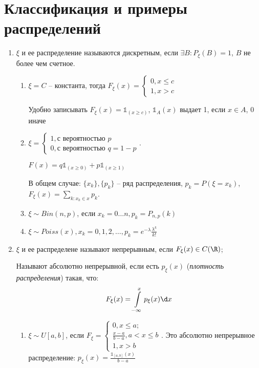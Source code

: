 \section{Классификация и примеры распределений}
\begin{enumerate}[label=\Roman*.]
    \item $\xi$ и ее распределение называются дискретным, если $\exists B\colon P_{\xi}(B) = 1$, $B$ не более чем счетное.
    \begin{enumerate}[label=\arabic*.]
    \item $\xi = C$ -- константа, тогда $F_{\xi}(x) = \begin{cases} 0, x \leq c \\ 1, x > c\end{cases}$
    \begin{Rem}
        Удобно записывать $F_{\xi}(x) = \mathbb{1}_{(x \geq c)}$, $\mathbb{1}_A (x)$ выдает 1, если $x \in A$, 0 иначе
    \end{Rem}   
    \item $\xi = \begin{cases} 1, \text{с вероятностью } p \\ 0, \text{с вероятностью } q = 1 - p\end{cases}$.

    $F(x) = q \mathbb{1}_{(x \geq 0)} + p \mathbb{1}_{(x \geq 1)}$

    В общем случае: $\{x_k\}, \{p_k\}$ -- ряд распределения, $p_k = P(\xi = x_k)$, $F_{\xi}(x) = \sum\limits_{k\colon x_k \in x} p_k$.

    \item
    $\xi \sim Bin(n, p)$, если $x_k = 0 \dots n, p_k = P_{n,p}(k)$

    \item
    $\xi \sim Poiss(x), x_k = 0, 1, 2, \dots, p_k = e^{-\lambda} \frac{\lambda^k}{k!}$
    \end{enumerate}
    \item
    \begin{Def}
    $\xi$ и ее распределене называют непрерывным, если $F_{\xi}(x) \in C(\R)$; 
    \end{Def}
    
    \begin{Def}
    Называют абсолютно непрерывной, если есть $p_{\xi}(x)$ (\textit{плотность распределения}) такая, что:
    \[ F_{\xi}(x) =\int\limits_{-\infty}^{x} p_{\xi}(x) \d x\]
    \end{Def}

    \begin{enumerate}[label=\arabic*.]
    \item
        $\xi \sim U[a, b]$, если
        $F_{\xi} = \begin{cases}
            0, x \leq a; \\
            \frac{x - a}{b - a}, a < x \leq b \\
            1, x > b\end{cases}$.
        Это абсолютно непрерывное распределение:
        $p_{\xi}(x) = \frac{\mathbb{1}_{[a, b]}(x)}{b - a}$


\end{enumerate}
\end{enumerate}
